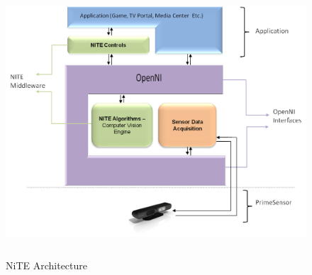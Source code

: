 \begin{figure}
	[h] \centering 
	\includegraphics[height=10cm]{figures/content/ni-arch.jpg} \caption{NiTE Architecture} \label{fg:ni:arch} 
\end{figure}
